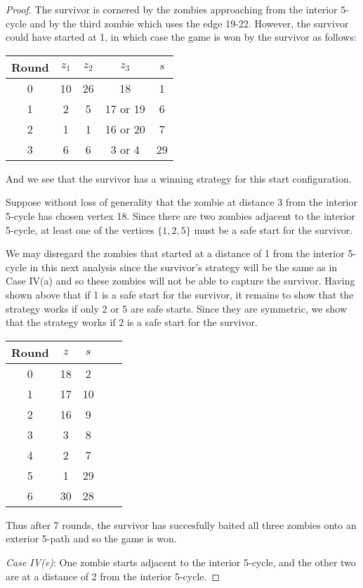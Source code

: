 \begin{proof}
The survivor is cornered by the zombies approaching from the interior 5-cycle and by the third zombie which uses the edge 19-22.
However, the survivor could have started at 1, in which case the game is won by the survivor as follows:

\begin{tabular}{c | c | c | c | c }
Round & $z_1$ & $z_2$ & $z_3$ & $s$ \\
\hline
0 & 10 & 26 & 18 & 1 \\
1 & 2 & 5 & 17 or 19 & 6 \\
2 & 1 & 1 & 16 or 20 & 7 \\
3 & 6 & 6 & 3 or 4 & 29
\end{tabular}

And we see that the survivor has a winning strategy for this start configuration.

Suppose without loss of generality that the zombie at distance 3 from the interior 5-cycle has chosen vertex 18.
Since there are two zombies adjacent to the interior 5-cycle, at least one of the vertices $\{1, 2, 5\}$ must be a safe start for the survivor.

We may disregard the zombies that started at a distance of 1 from the interior 5-cycle in this next analysis since the survivor's strategy will be the
same as in Case IV(a) and so these zombies will not be able to capture the survivor. Having shown above that if 1 is a safe start for the survivor, it
remains to show that the strategy works if only 2 or 5 are safe starts. Since they are symmetric, we show that the strategy works if 2 is a safe start for the
survivor.

\begin{tabular}{c | c | c | c | c }
Round & $z$ & $s$ \\
\hline
0 & 18 & 2 \\
1 & 17 & 10 \\
2 & 16 & 9 \\
3 & 3 & 8 \\
4 & 2 & 7 \\
5 & 1 & 29 \\
6 & 30 & 28
\end{tabular}

Thus after 7 rounds, the survivor has succesfully baited all three zombies onto an exterior 5-path and so the game is won.

\textit{Case IV(e)}: One zombie starts adjacent to the interior 5-cycle, and the other two are at a distance of 2 from the interior 5-cycle.


\end{proof}
